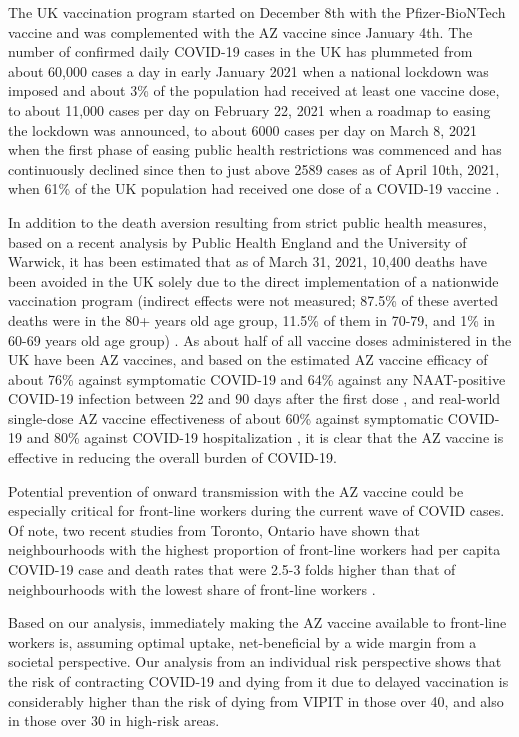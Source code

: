 \documentclass[]{interact}
\theoremstyle{plain}%
\theoremstyle{definition}
\theoremstyle{remark}
\begin{document}
The UK vaccination program started on December 8th with the
Pfizer-BioNTech vaccine and was complemented with the AZ vaccine since
January 4th. The number of confirmed daily COVID-19 cases in the UK has
plummeted from about 60,000 cases a day in early January 2021 when a
national lockdown was imposed and about 3\% of the population had
received at least one vaccine dose, to about 11,000 cases per day on
February 22, 2021 when a roadmap to easing the lockdown was announced,
to about 6000 cases per day on March 8, 2021 when the first phase of
easing public health restrictions was commenced
\citep{bbc_lockdown_2021} and has continuously declined since then to
just above 2589 cases as of April 10th, 2021, when 61\% of the UK
population had received one dose of a COVID-19 vaccine
\citep{govuk_official_2021}.

In addition to the death aversion resulting from strict public health
measures, based on a recent analysis by Public Health England and the
University of Warwick, it has been estimated that as of March 31, 2021,
10,400 deaths have been avoided in the UK solely due to the direct
implementation of a nationwide vaccination program (indirect effects
were not measured; 87.5\% of these averted deaths were in the 80+ years
old age group, 11.5\% of them in 70-79, and 1\% in 60-69 years old age
group) \citep{public_health_england_impact_2021}. As about half of all
vaccine doses administered in the UK have been AZ vaccines, and based on
the estimated AZ vaccine efficacy of about 76\% against symptomatic
COVID-19 and 64\% against any NAAT-positive COVID-19 infection between
22 and 90 days after the first dose \citep{voysey_single-dose_2021}, and
real-world single-dose AZ vaccine effectiveness of about 60\% against
symptomatic COVID-19 and 80\% against COVID-19 hospitalization
\citep{public_health_england_1public_2021}, it is clear that the AZ
vaccine is effective in reducing the overall burden of COVID-19.

Potential prevention of onward transmission with the AZ vaccine could be
especially critical for front-line workers during the current wave of
COVID cases. Of note, two recent studies from Toronto, Ontario have
shown that neighbourhoods with the highest proportion of front-line
workers had per capita COVID-19 case and death rates that were 2.5-3
folds higher than that of neighbourhoods with the lowest share of
front-line workers
\citep[\citet{rao_disproportionate_2021}]{chagla_characterizing_2021}.

Based on our analysis, immediately making the AZ vaccine available to
front-line workers is, assuming optimal uptake, net-beneficial by a wide
margin from a societal perspective. Our analysis from an individual risk
perspective shows that the risk of contracting COVID-19 and dying from
it due to delayed vaccination is considerably higher than the risk of
dying from VIPIT in those over 40, and also in those over 30 in
high-risk areas.
\end{document}
